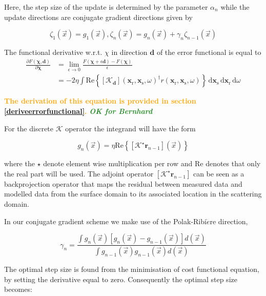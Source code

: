\documentclass[10pt,a4paper]{article}
\newcommand{\partder}[2]{\ensuremath{\frac{\partial #1}{\partial #2}}}
\newcommand{\df}[1]{\, \ensuremath{\mbox{d}#1}}
\newcommand{\real}[1]{\text{Re} \left\{ #1 \right\}}
\newcommand{\newstmtwo}[1]{\textcolor{orange}{\textbf{#1}}}
\newcommand{\brok}{\textcolor{ForestGreen}{\textit{\textbf{OK for Bernhard}}}}
\newcommand{\xs}{\mathbf{x}_\text{s}}
\newcommand{\xr}{\mathbf{x}_\text{r}}
\begin{document}
Here, the step size of the update is determined by the parameter $\alpha_n$ while the update directions are conjugate gradient directions given by

\begin{equation} \label{eq:eq14}\zeta_1(\vec{x}) = g_1(\vec{x}) ,\zeta_n(\vec{x}) = g_n(\vec{x}) + \gamma_n\zeta_{n-1}(\vec{x}) \end{equation}

The functional derivative w.r.t. $\chi$ in direction $\mathbf{d}$ of the error functional is equal to
\begin{subequations}
\begin{align}
\partder{F(\mathbf{\chi}, \mathbf{d})}{\mathbf{\chi}} & = \lim_{\epsilon \rightarrow 0} \frac{F(\mathbf{\chi} + \epsilon \mathbf{d}) - F(\mathbf{\chi})}{\epsilon} \\
& = -2 \eta \int \real{\left[\mathcal{K}_\mathbf{d} \right](\xr, \xs, \omega)^{\dagger} r (\xr, \xs, \omega)} \df{\xs} \df{\xr} \df{\omega}
\label{eq:hi}
\end{align}
\end{subequations}

\newstmtwo{The derivation of this equation is provided in section \ref{deriveerrorfunctional}.}
{\brok}

For the discrete $\mathcal{K}$ operator the integrand will have the form

\begin{equation} \label{eq:eq15} g_n(\vec{x}) = \eta \real{[\mathcal{K}^\star\mathbf{r}_{n-1}](\vec{x})} \end{equation}

where the $\star$ denote element wise multiplication per row and Re denotes that only the real part will be used.
The adjoint operator $[\mathcal{K}^\star\mathbf{r}_{n-1}]$ can be seen as a backprojection operator that maps the residual between measured data and modelled data from the surface domain to its associated location in the scattering domain.

In our conjugate gradient scheme we make use of the Polak-Ribi$\grave{e}$re direction,

\begin{equation} \label{eq:eq16} \gamma_n = \frac{\int g_n(\vec{x})[g_n(\vec{x})-g_{n-1}(\vec{x})]d(\vec{x})}{\int g_{n-1}(\vec{x}) g_{n-1}(\vec{x})d(\vec{x})} \end{equation}

The optimal step size is found from the minimisation of cost functional equation, by setting the derivative equal to zero. Consequently the optimal step size becomes:
\end{document}
